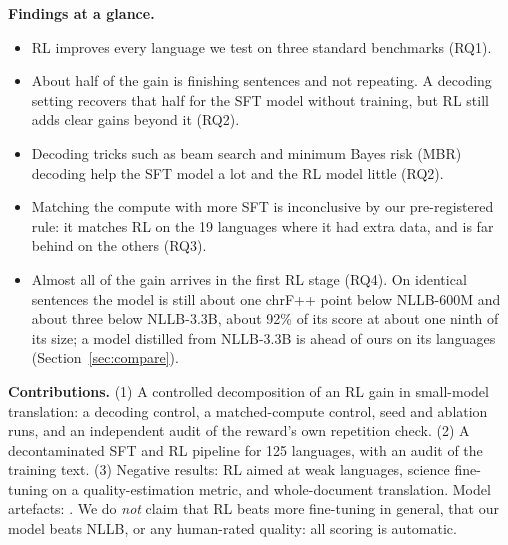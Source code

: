 \textbf{Findings at a glance.}
\begin{itemize}
\item RL improves every language we test on three standard benchmarks (RQ1).
\item About half of the gain is finishing sentences and not repeating. A decoding setting recovers that half for the SFT model without training, but RL still adds clear gains beyond it (RQ2).
\item Decoding tricks such as beam search and minimum Bayes risk (MBR) decoding help the SFT model a lot and the RL model little (RQ2).
\item Matching the compute with more SFT is inconclusive by our pre-registered rule: it matches RL on the 19 languages where it had extra data, and is far behind on the others (RQ3).
\item Almost all of the gain arrives in the first RL stage (RQ4). On identical sentences the model is still about one chrF++ point below NLLB-600M and about three below NLLB-3.3B, about 92\% of its score at about one ninth of its size; a model distilled from NLLB-3.3B is ahead of ours on its languages (Section~\ref{sec:compare}).
\end{itemize}

\textbf{Contributions.} (1) A controlled decomposition of an RL gain in small-model translation: a decoding control, a matched-compute control, seed and ablation runs, and an independent audit of the reward's own repetition check. (2) A decontaminated SFT and RL pipeline for 125 languages, with an audit of the training text. (3) Negative results: RL aimed at weak languages, science fine-tuning on a quality-estimation metric, and whole-document translation. Model artefacts: .
We do \emph{not} claim that RL beats more fine-tuning in general, that our model beats NLLB, or any human-rated quality: all scoring is automatic.
